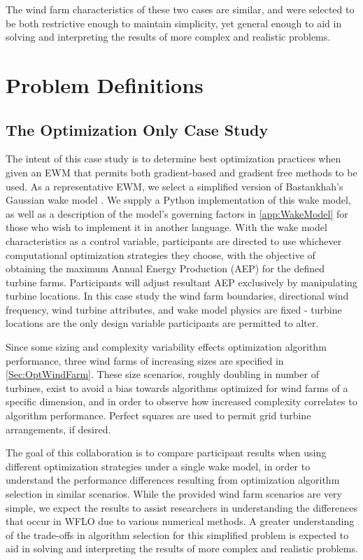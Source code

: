 \documentclass[12pt]{article}
\begin{document}
    The wind farm characteristics of these two cases are similar, and were selected to be both restrictive enough to maintain simplicity, yet general enough to aid in solving and interpreting the results of more complex and realistic problems.

\section{Problem Definitions}
\subsection{The Optimization Only Case Study}\label{Sec:OptOnly}
    The intent of this case study is to determine best optimization practices when given an EWM that permits both gradient-based and gradient free methods to be used. As a representative EWM, we select a simplified version of Bastankhah's Gaussian wake model \cite{Thomas2018,Bastankhah2014,Bastankhah2016}. We supply a Python implementation of this wake model, as well as a description of the model's governing factors in \cref{app:WakeModel} for those who wish to implement it in another language.
    With the wake model characteristics as a control variable, participants are directed to use whichever computational optimization strategies they choose, with the objective of obtaining the maximum Annual Energy Production (AEP) for the defined turbine farms. Participants will adjust resultant AEP exclusively by manipulating turbine locations. In this case study the wind farm boundaries, directional wind frequency, wind turbine attributes, and wake model physics are fixed - turbine locations are the only design variable participants are permitted to alter.
    
    Since some sizing and complexity variability effects optimization algorithm performance, three wind farms of increasing sizes are specified in \cref{Sec:OptWindFarm}. These size scenarios, roughly doubling in number of turbines, exist to avoid a bias towards algorithms optimized for wind farms of a specific dimension, and in order to observe how increased complexity correlates to algorithm performance. Perfect squares are used to permit grid turbine arrangements, if desired.
    
    The goal of this collaboration is to compare participant results when using different optimization strategies under a single wake model, in order to understand the performance differences resulting from optimization algorithm selection in similar scenarios. While the provided wind farm scenarios are very simple, we expect the results to assist researchers in understanding the differences that occur in WFLO due to various numerical methods. A greater understanding of the trade-offs in algorithm selection for this simplified problem is expected to aid in solving and interpreting the results of more complex and realistic problems.
\end{document}
